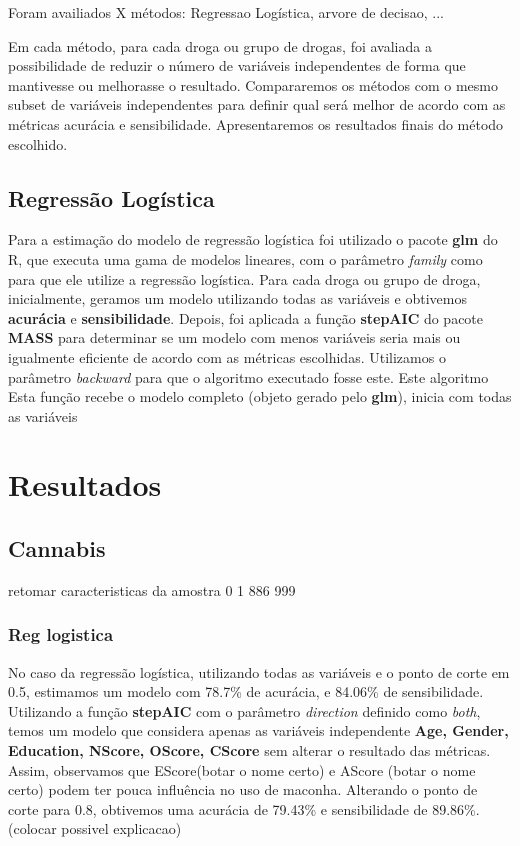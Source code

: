 \documentclass[
	article,			%
	11pt,				%
	oneside,			%
	a4paper,			%
	english,			%
	brazil,				%
	sumario=tradicional
	]{abntex2}
\begin{document}
Foram availiados X métodos: Regressao Logística, arvore de decisao, ... 

Em cada método, para cada droga ou grupo de drogas, foi avaliada a possibilidade de reduzir o número de variáveis independentes de forma que mantivesse ou melhorasse o resultado. Compararemos os métodos com o mesmo subset de variáveis independentes para definir qual será melhor de acordo com as métricas acurácia e sensibilidade. Apresentaremos os resultados finais do método escolhido. 

\subsection{Regressão Logística}

Para a estimação do modelo de regressão logística foi utilizado o pacote \textbf{glm} do R, que executa uma gama de modelos lineares, com o parâmetro \emph{family} como  para que ele utilize a regressão logística.
Para cada droga ou grupo de droga, inicialmente, geramos um modelo utilizando todas as variáveis e obtivemos \textbf{acurácia} e \textbf{sensibilidade}. Depois, foi aplicada a função \textbf{stepAIC} do pacote \textbf{MASS} para determinar se um modelo com menos variáveis seria mais ou igualmente eficiente de acordo com as métricas escolhidas. Utilizamos o parâmetro \emph{backward} para que o algoritmo executado fosse este. Este algoritmo Esta função recebe o modelo completo (objeto gerado pelo \textbf{glm}), inicia com todas as variáveis 



\section{Resultados}

\subsection{Cannabis}

retomar caracteristicas da amostra
 0   1 
886 999 

\subsubsection{Reg logistica}

No caso da regressão logística, utilizando todas as variáveis e o ponto de corte em 0.5, estimamos um modelo com 78.7\% de acurácia, e 84.06\% de sensibilidade. 
Utilizando a função \textbf{stepAIC} com o parâmetro \emph{direction} definido como \emph{both}, temos um modelo que considera apenas as variáveis independente \textbf{Age, Gender, Education, NScore, OScore, CScore} sem alterar o resultado das métricas. Assim, observamos que EScore(botar o nome certo) e AScore (botar o nome certo) podem ter pouca influência no uso de maconha.
Alterando o ponto de corte para 0.8, obtivemos uma acurácia de 79.43\% e sensibilidade de 89.86\%. (colocar possivel explicacao)
\end{document}
